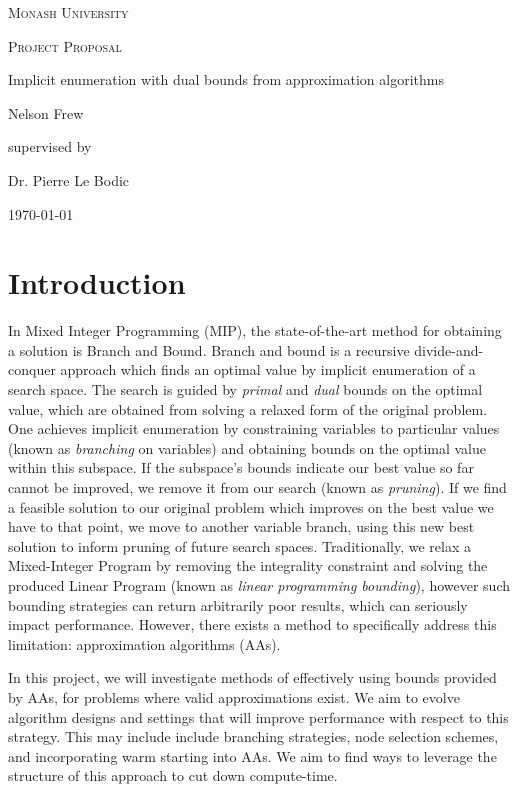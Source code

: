 \documentclass[12pt, a4paper]{article}
\begin{document}
\begin{titlepage}
  \centering
  {\scshape\LARGE Monash University \par}
  \vspace{1cm}
  {\scshape\Large Project Proposal \par}
  \vspace{1.5cm}
  {\huge Implicit enumeration with dual bounds from approximation algorithms\par}
  \vspace{2cm}
  {\Large Nelson Frew\par}
  \vfill
  supervised by\par
  Dr. Pierre Le Bodic
  \vfill
  {\large \today\par}
\end{titlepage}
\tableofcontents
\newpage
\section{Introduction}
In Mixed Integer Programming (MIP), the state-of-the-art method for obtaining a solution is Branch and Bound. Branch and bound is a recursive divide-and-conquer approach which finds an optimal value by implicit enumeration of a search space. The search is guided by \emph{primal} and \emph{dual} bounds on the optimal value, which are obtained from solving a relaxed form of the original problem. One achieves implicit enumeration by constraining variables to particular values (known as \emph{branching} on variables) and obtaining bounds on the optimal value within this subspace. If the subspace's bounds indicate our best value so far cannot be improved, we remove it from our search (known as \emph{pruning}). If we find a feasible solution to our original problem which improves on the best value we have to that point, we move to another variable branch, using this new best solution to inform pruning of future search spaces. Traditionally, we relax a Mixed-Integer Program by removing the integrality constraint and solving the produced Linear Program (known as \emph{linear programming bounding}), however such bounding strategies can return arbitrarily poor results, which can seriously impact performance. However, there exists a method to specifically address this limitation: approximation algorithms (AAs).  

In this project, we will investigate methods of effectively using bounds provided by AAs, for problems where valid approximations exist. We aim to evolve algorithm designs and settings that will improve performance with respect to this strategy. This may include include branching strategies, node selection schemes, and incorporating warm starting into AAs. We aim to find ways to leverage the structure of this approach to cut down compute-time.
\end{document}
